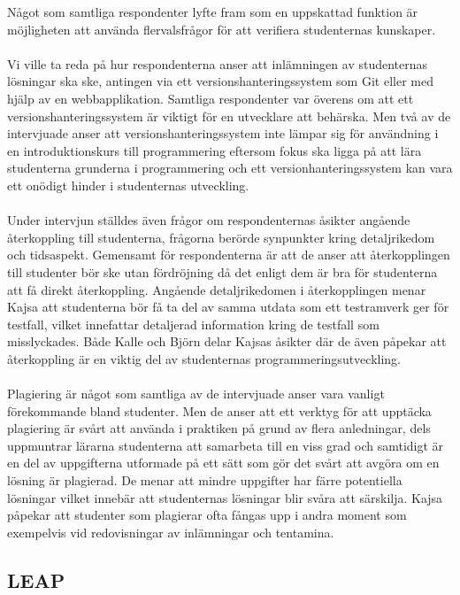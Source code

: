 \documentclass[a4paper,11pt]{article}
\begin{document}
{Något som samtliga respondenter lyfte fram som en uppskattad funktion är möjligheten att använda flervalsfrågor för att verifiera studenternas kunskaper.
\\
\\
Vi ville ta reda på hur respondenterna anser att inlämningen av studenternas lösningar ska ske, antingen via ett versionshanteringssystem som Git eller med hjälp av en webbapplikation. Samtliga respondenter var överens om att ett versionshanteringssystem är viktigt för en utvecklare att behärska. Men två av de intervjuade anser att versionshanteringssystem inte lämpar sig för användning i en introduktionskurs till programmering eftersom fokus ska ligga på att lära studenterna grunderna i programmering och ett versionhanteringssystem kan vara ett onödigt hinder i studenternas utveckling.
\\
\\
Under intervjun ställdes även frågor om respondenternas åsikter angående återkoppling till studenterna, frågorna berörde synpunkter kring detaljrikedom och tidsaspekt. Gemensamt för respondenterna är att de anser att återkopplingen till studenter bör ske utan fördröjning då det enligt dem är bra för studenterna att få direkt återkoppling. Angående detaljrikedomen i återkopplingen menar Kajsa att studenterna bör få ta del av samma utdata som ett testramverk ger för testfall, vilket innefattar detaljerad information kring de testfall som misslyckades. Både Kalle och Björn delar Kajsas åsikter där de även påpekar att återkoppling är en viktig del av studenternas programmeringsutveckling.
\\
\\
Plagiering är något som samtliga av de intervjuade anser vara vanligt förekommande bland studenter. Men de anser att ett verktyg för att upptäcka plagiering är svårt att använda i praktiken på grund av flera anledningar, dels uppmuntrar lärarna studenterna att samarbeta till en viss grad och samtidigt är en del av uppgifterna utformade på ett sätt som gör det svårt att avgöra om en lösning är plagierad. De menar att mindre uppgifter har färre potentiella lösningar vilket innebär att studenternas lösningar blir svåra att särskilja. Kajsa påpekar att studenter som plagierar ofta fångas upp i andra moment som exempelvis vid redovisningar av inlämningar och tentamina. 
 

\newpage
\subsection{LEAP} \label{LEAP}
}
\end{document}
